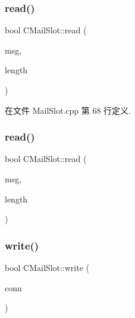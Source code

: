 \mbox{\label{class_c_mail_slot_a17b53bd1601b38ba99bac0dda7ac0794}} 
\subsubsection{\texorpdfstring{read()}{read()}\hspace{0.1cm}{\footnotesize\ttfamily [3/4]}}
{\footnotesize\ttfamily bool C\+Mail\+Slot\+::read (\begin{DoxyParamCaption}\item[{char $\ast$\&}]{msg,  }\item[{int \&}]{length }\end{DoxyParamCaption})}



在文件 Mail\+Slot.\+cpp 第 68 行定义.

\mbox{\label{class_c_mail_slot_a17b53bd1601b38ba99bac0dda7ac0794}} 
\subsubsection{\texorpdfstring{read()}{read()}\hspace{0.1cm}{\footnotesize\ttfamily [4/4]}}
{\footnotesize\ttfamily bool C\+Mail\+Slot\+::read (\begin{DoxyParamCaption}\item[{char $\ast$\&}]{msg,  }\item[{int \&}]{length }\end{DoxyParamCaption})}

\mbox{\label{class_c_mail_slot_a5eb6d0ece129a9c023cd058f45653427}} 
\subsubsection{\texorpdfstring{write()}{write()}\hspace{0.1cm}{\footnotesize\ttfamily [1/4]}}
{\footnotesize\ttfamily bool C\+Mail\+Slot\+::write (\begin{DoxyParamCaption}\item[{const \hyperlink{class_c_net_conn}{C\+Net\+Conn} \&}]{conn }\end{DoxyParamCaption})}

